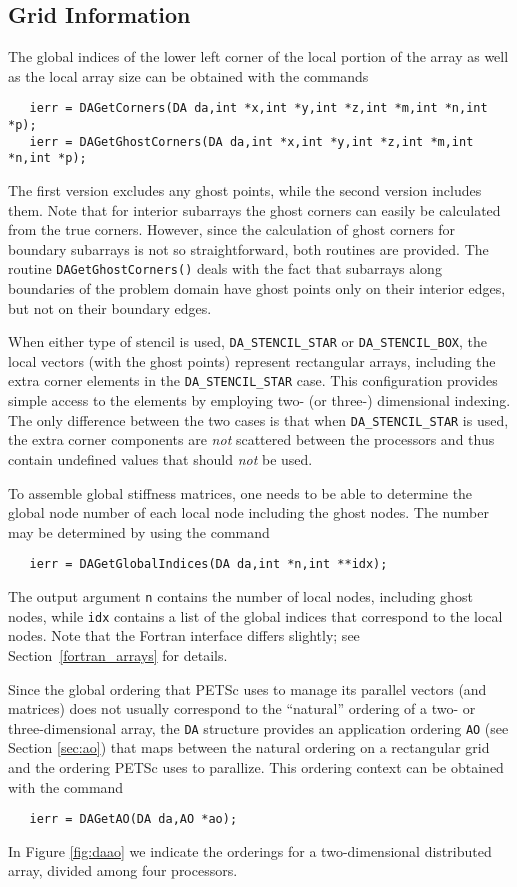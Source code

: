 \subsection{Grid Information}

The global indices of the lower left corner of the local portion of the array 
as well as the local array size can be obtained with the commands
 
\begin{verbatim}
   ierr = DAGetCorners(DA da,int *x,int *y,int *z,int *m,int *n,int *p);
   ierr = DAGetGhostCorners(DA da,int *x,int *y,int *z,int *m,int *n,int *p);
\end{verbatim}
The first version excludes any ghost points, while the second version
includes them. Note that for interior subarrays the ghost corners can
easily be calculated from the true corners.  However, since the
calculation of ghost corners for boundary subarrays is not so
straightforward, both routines are provided.
The routine  {\tt DAGetGhostCorners()}
deals with the fact that subarrays along boundaries of the problem
domain have ghost points only on their interior edges, but not on
their boundary edges.

When either type of stencil is used, {\tt DA\_STENCIL\_STAR} or 
{\tt DA\_STENCIL\_BOX}, the local vectors (with the ghost points) 
represent rectangular arrays, including the extra corner elements in 
the {\tt DA\_STENCIL\_STAR} case. This configuration provides simple 
access to the elements by employing two- (or three-) dimensional indexing. 
The only difference between the 
two cases is that when {\tt DA\_STENCIL\_STAR} is used, the extra 
corner components are {\em not} scattered between the processors and thus
contain undefined values that should {\em not} be used.

To assemble global stiffness matrices, one needs to be 
able to determine the global node number of each local node 
including the ghost nodes. The number may be determined by using the 
command 
\begin{verbatim}
   ierr = DAGetGlobalIndices(DA da,int *n,int **idx);
\end{verbatim}
The output argument {\tt n} contains the number of 
local nodes, including ghost nodes, while {\tt idx} contains
a list of the global indices that correspond to the local nodes.
Note that the Fortran interface differs slightly; see Section~\ref{fortran_arrays}
for details.

Since the global ordering that PETSc uses to manage its parallel vectors 
(and matrices) does not usually correspond to the ``natural'' ordering 
of a two- or three-dimensional array, the {\tt DA} structure provides 
an application ordering {\tt AO} (see Section \ref{sec:ao}) that maps 
between the natural ordering on a rectangular grid and the ordering PETSc
uses to parallize. This ordering context can be obtained with the command
\begin{verbatim}
   ierr = DAGetAO(DA da,AO *ao);
\end{verbatim}
In Figure \ref{fig:daao} we indicate the orderings for a two-dimensional distributed 
array, divided among four processors.

